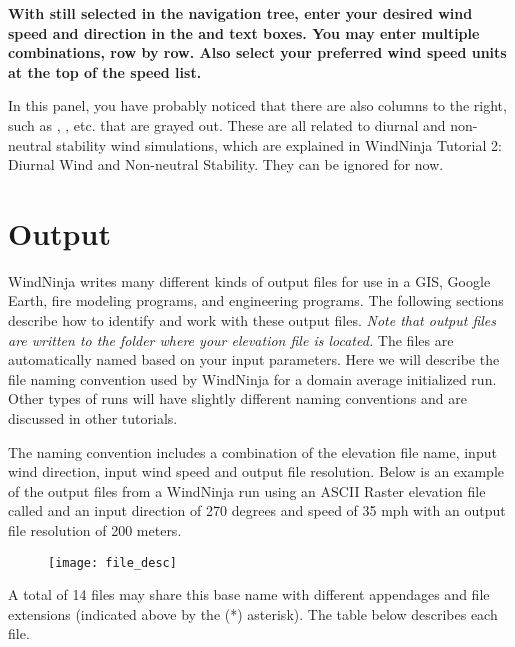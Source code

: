 \documentclass[12pt]{article}
\begin{document}
\textbf{\color{red} With  still selected in the navigation tree, enter your desired wind speed and direction in the  and  text boxes.  You may enter multiple combinations, row by row.  Also select your preferred wind speed units at the top of the speed list.}

In this panel, you have probably noticed that there are also columns to the right, such as , , etc. that are grayed out.  These are all related to diurnal and non-neutral stability wind simulations, which are explained in WindNinja Tutorial 2: Diurnal Wind and Non-neutral Stability.  They can be ignored for now.

\section{Output}

WindNinja writes many different kinds of output files for use in a GIS, Google Earth, fire modeling programs, and engineering programs.  The following sections describe how to identify and work with these output files.  \textit{Note that output files are written to the folder where your elevation file is located.} The files are automatically named based on your input parameters.  Here we will describe the file naming convention used by WindNinja for a domain average initialized run.  Other types of runs will have slightly different naming conventions and are discussed in other tutorials.

The naming convention includes a combination of the elevation file name, input wind direction, input wind speed and output file resolution.  Below is an example of the output files from a WindNinja run using an ASCII Raster elevation file called  and an input direction of 270 degrees and speed of 35 mph with an output file resolution of 200 meters.

\begin{figure}[H]
	\label{}
	\centering
	\texttt{[image: file\_desc]}
\end{figure}

A total of 14 files may share this base name with different appendages and file extensions (indicated above by the (*) asterisk).  The table below describes each file.
\newline
\end{document}
